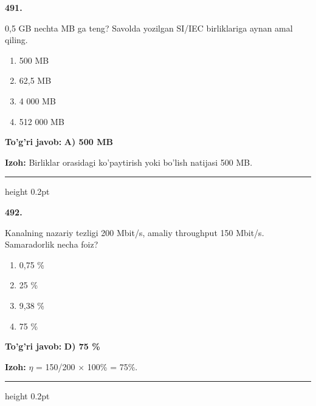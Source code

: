 \documentclass[10pt,a4paper,oneside]{article}
\begin{document}
\noindent\textbf{\color{ink}491.}
\par
0,5 GB nechta MB ga teng? Savolda yozilgan SI/IEC birliklariga aynan amal qiling.
\begin{enumerate}[label=\Alph*),leftmargin=9mm]
\item 500 MB
\item 62,5 MB
\item 4 000 MB
\item 512 000 MB
\end{enumerate}
\begin{tcolorbox}[enhanced,breakable,colback=teal!4,colframe=teal!50!black,boxrule=0.5pt,arc=1.1mm,left=3mm,right=3mm,top=1.7mm,bottom=1.7mm,before skip=2mm,after skip=2mm]
\textbf{\color{teal}To'g'ri javob:} \textbf{A) 500 MB}
\par\smallskip
\textbf{Izoh:} Birliklar orasidagi ko'paytirish yoki bo'lish natijasi 500 MB.
\end{tcolorbox}
\vspace{2mm}\hrule height 0.2pt \vspace{3mm}

\noindent\textbf{\color{ink}492.}
\par
Kanalning nazariy tezligi 200 Mbit/s, amaliy throughput 150 Mbit/s. Samaradorlik necha foiz?
\begin{enumerate}[label=\Alph*),leftmargin=9mm]
\item 0,75 \%
\item 25 \%
\item 9,38 \%
\item 75 \%
\end{enumerate}
\begin{tcolorbox}[enhanced,breakable,colback=teal!4,colframe=teal!50!black,boxrule=0.5pt,arc=1.1mm,left=3mm,right=3mm,top=1.7mm,bottom=1.7mm,before skip=2mm,after skip=2mm]
\textbf{\color{teal}To'g'ri javob:} \textbf{D) 75 \%}
\par\smallskip
\textbf{Izoh:} \ensuremath{\eta} = 150/200 \ensuremath{\times} 100\% = 75\%.
\end{tcolorbox}
\vspace{2mm}\hrule height 0.2pt \vspace{3mm}
\end{document}

